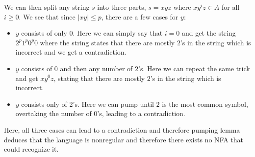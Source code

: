 \documentclass{article}
\begin{document}
		 We can then split any string $s$ into three parts, $s=xyz$ where 
		 $xy^iz\in A$ for all $i\geq0$. We see that since $|xy| \leq p$, 
		 there are a few cases for $y$:

		 \begin{itemize}
			 \item $y$ consists of only $0$. Here we can simply say that 
				 $i=0$ and get the string $2^p1^p0^p0$ where the string 
				 states that there are mostly $2$'s 
				 in the string which is incorrect and we get a contradiction.
			 \item $y$ consists of $0$ and then any number of $2$'s. 
				 Here we can repeat the same trick and get $xy^0z$, stating 
				 that there are mostly $2$'s in the string which is 
				 incorrect.
			 \item $y$ consists only of $2$'s. Here we can pump until $2$ 
				 is the most common symbol, overtaking the number of $0$'s, 
				 leading to a contradiction.
		 \end{itemize}

		 Here, all three cases can lead to a contradiction and therefore 
		 pumping lemma deduces that the language is nonregular and therefore 
		 there exists no NFA that could recognize it.
\end{document}

